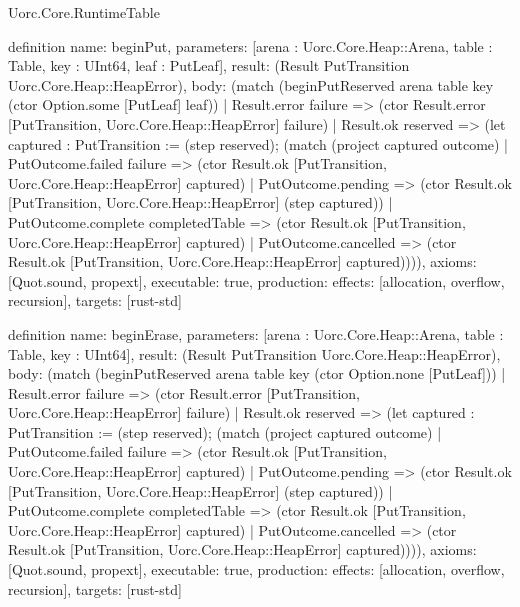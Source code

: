 \begin{lexlean}{Uorc.Core.RuntimeTable}
\begin{semanticmodule}
definition{
  name: beginPut,
  parameters: [arena : Uorc.Core.Heap::Arena, table : Table, key : UInt64, leaf : PutLeaf],
  result: (Result PutTransition Uorc.Core.Heap::HeapError),
  body: (match (beginPutReserved arena table key (ctor Option.some [PutLeaf] leaf))
    | Result.error failure => (ctor Result.error [PutTransition, Uorc.Core.Heap::HeapError] failure)
    | Result.ok reserved => (let captured : PutTransition := (step reserved); (match (project captured outcome)
      | PutOutcome.failed failure => (ctor Result.ok [PutTransition, Uorc.Core.Heap::HeapError] captured)
      | PutOutcome.pending => (ctor Result.ok [PutTransition, Uorc.Core.Heap::HeapError] (step captured))
      | PutOutcome.complete completedTable => (ctor Result.ok [PutTransition, Uorc.Core.Heap::HeapError] captured)
      | PutOutcome.cancelled => (ctor Result.ok [PutTransition, Uorc.Core.Heap::HeapError] captured)))),
  axioms: [Quot.sound, propext],
  executable: true,
  production: {effects: [allocation, overflow, recursion], targets: [rust-std]}
}

definition{
  name: beginErase,
  parameters: [arena : Uorc.Core.Heap::Arena, table : Table, key : UInt64],
  result: (Result PutTransition Uorc.Core.Heap::HeapError),
  body: (match (beginPutReserved arena table key (ctor Option.none [PutLeaf]))
    | Result.error failure => (ctor Result.error [PutTransition, Uorc.Core.Heap::HeapError] failure)
    | Result.ok reserved => (let captured : PutTransition := (step reserved); (match (project captured outcome)
      | PutOutcome.failed failure => (ctor Result.ok [PutTransition, Uorc.Core.Heap::HeapError] captured)
      | PutOutcome.pending => (ctor Result.ok [PutTransition, Uorc.Core.Heap::HeapError] (step captured))
      | PutOutcome.complete completedTable => (ctor Result.ok [PutTransition, Uorc.Core.Heap::HeapError] captured)
      | PutOutcome.cancelled => (ctor Result.ok [PutTransition, Uorc.Core.Heap::HeapError] captured)))),
  axioms: [Quot.sound, propext],
  executable: true,
  production: {effects: [allocation, overflow, recursion], targets: [rust-std]}
}
\end{semanticmodule}
\end{lexlean}
